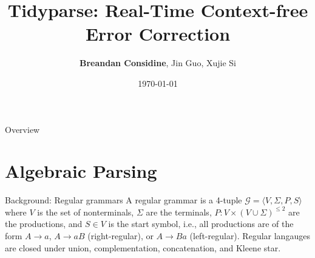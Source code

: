 \documentclass{beamer}
\title[Tidyparse: Real-Time Context-free Error Correction]{Tidyparse: Real-Time Context-free Error Correction}
\author[Considine, Guo, Si]{\textbf{Breandan Considine}, Jin Guo, Xujie Si}
\institute[McGill]{
    McGill University, Mila IQIA\\
    \medskip
    \textit{bre@ndan.co}
}
\date{\today}
\begin{document}
    \begin{frame}
        \titlepage
    \end{frame}

    \begin{frame}{Overview}
        \tableofcontents
    \end{frame}

    
    \section{Algebraic Parsing}\label{sec:algebraic-parsing}


    \begin{frame}[fragile]{Background: Regular grammars}
        A regular grammar is a 4-tuple $\mathcal{G} = \langle V, \Sigma, P, S\rangle$ where $V$ is the set of nonterminals, $\Sigma$ are the terminals, $P: V\times (V \cup \Sigma)^{\leq 2}$ are the productions, and $S\in V$ is the start symbol, i.e., all productions are of the form $A \rightarrow a$, $A \rightarrow a B$ (right-regular), or $A \rightarrow B a$ (left-regular). Regular langauges are closed under union, complementation, concatenation, and Kleene star.


\end{frame}
\end{document}
